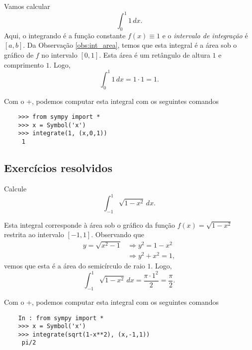 \begin{ex}
  Vamos calcular
  \begin{equation}
    \int_0^1 1\,dx.
  \end{equation}
  Aqui, o integrando é a função constante $f(x) \equiv 1$ e o \emph{intervalo de integração} é $[a, b]$. Da Observação \ref{obs:int_area}, temos que esta integral é a área sob o gráfico de $f$ no intervalo $[0, 1]$. Esta área é um retângulo de altura $1$ e comprimento $1$. Logo,
  \begin{equation}
    \int_0^1 1\,dx = 1\cdot 1 = 1.
  \end{equation}

  \ifispython
  Com o {\python}+{\sympy}, podemos computar esta integral com os seguintes comandos
  \begin{lstlisting}
    >>> from sympy import *
    >>> x = Symbol('x')
    >>> integrate(1, (x,0,1))
     1
  \end{lstlisting}
  \fi
\end{ex}

\subsection{Exercícios resolvidos}

\begin{exeresol}
  Calcule
  \begin{equation}
    \int_{-1}^1 \sqrt{1 - x^2}\,dx.
  \end{equation}
\end{exeresol}
\begin{resol}
  Esta integral corresponde à área sob o gráfico da função $f(x) = \sqrt{1 - x^2}$ restrita ao intervalo $[-1, 1]$. Observando que
  \begin{align}
    y = \sqrt{x^2 - 1} &\Rightarrow y^2 = 1 - x^2\\
                       &\Rightarrow y^2 + x^2 = 1,
  \end{align}
  vemos que esta é a área do semicírculo de raio $1$. Logo,
  \begin{equation}
    \int_{-1}^1 \sqrt{1 - x^2}\,dx = \frac{\pi \cdot 1^2}{2} = \frac{\pi}{2}.
  \end{equation}

  \ifispython
  Com o {\python}+{\sympy}, podemos computar esta integral com os seguintes comandos
  \begin{lstlisting}
    In : from sympy import *
    >>> x = Symbol('x')
    >>> integrate(sqrt(1-x**2), (x,-1,1))
     pi/2
  \end{lstlisting}
  \fi
\end{resol}

